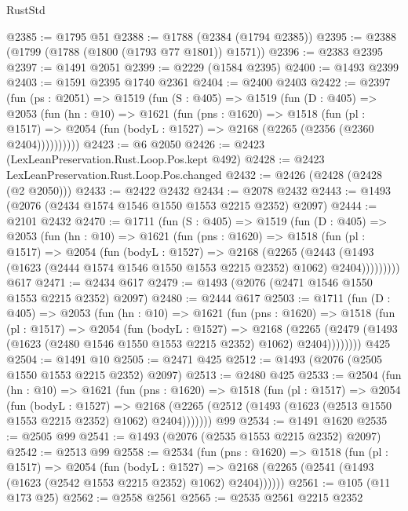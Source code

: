 \begin{lexlean}{RustStd}
\begin{coremodule}
@2385 := @1795 @51
@2388 := @1788 (@2384 (@1794 @2385))
@2395 := @2388 (@1799 (@1788 (@1800 (@1793 @77 @1801)) @1571))
@2396 := @2383 @2395
@2397 := @1491 @2051
@2399 := @2229 (@1584 @2395)
@2400 := @1493 @2399
@2403 := @1591 @2395 @1740 @2361
@2404 := @2400 @2403
@2422 := @2397
    (fun (ps : @2051) =>
    @1519
      (fun (S : @405) =>
      @1519
        (fun (D : @405) =>
        @2053
          (fun (hn : @10) =>
          @1621
            (fun (pns : @1620) =>
            @1518
              (fun (pl : @1517) =>
              @2054 (fun (bodyL : @1527) => @2168 (@2265 (@2356 (@2360 @2404))))))))))
@2423 := @6 @2050
@2426 := @2423 (LexLeanPreservation.Rust.Loop.Pos.kept @492)
@2428 := @2423 LexLeanPreservation.Rust.Loop.Pos.changed
@2432 := @2426 (@2428 (@2428 (@2 @2050)))
@2433 := @2422 @2432
@2434 := @2078 @2432
@2443 := @1493 (@2076 (@2434 @1574 @1546 @1550 @1553 @2215 @2352) @2097)
@2444 := @2101 @2432
@2470 := @1711
    (fun (S : @405) =>
    @1519
      (fun (D : @405) =>
      @2053
        (fun (hn : @10) =>
        @1621
          (fun (pns : @1620) =>
          @1518
            (fun (pl : @1517) =>
            @2054
              (fun (bodyL : @1527) =>
              @2168
                (@2265
                  (@2443
                    (@1493 (@1623 (@2444 @1574 @1546 @1550 @1553 @2215 @2352) @1062) @2404)))))))))
    @617
@2471 := @2434 @617
@2479 := @1493 (@2076 (@2471 @1546 @1550 @1553 @2215 @2352) @2097)
@2480 := @2444 @617
@2503 := @1711
    (fun (D : @405) =>
    @2053
      (fun (hn : @10) =>
      @1621
        (fun (pns : @1620) =>
        @1518
          (fun (pl : @1517) =>
          @2054
            (fun (bodyL : @1527) =>
            @2168
              (@2265 (@2479 (@1493 (@1623 (@2480 @1546 @1550 @1553 @2215 @2352) @1062) @2404))))))))
    @425
@2504 := @1491 @10
@2505 := @2471 @425
@2512 := @1493 (@2076 (@2505 @1550 @1553 @2215 @2352) @2097)
@2513 := @2480 @425
@2533 := @2504
    (fun (hn : @10) =>
    @1621
      (fun (pns : @1620) =>
      @1518
        (fun (pl : @1517) =>
        @2054
          (fun (bodyL : @1527) =>
          @2168 (@2265 (@2512 (@1493 (@1623 (@2513 @1550 @1553 @2215 @2352) @1062) @2404)))))))
    @99
@2534 := @1491 @1620
@2535 := @2505 @99
@2541 := @1493 (@2076 (@2535 @1553 @2215 @2352) @2097)
@2542 := @2513 @99
@2558 := @2534
    (fun (pns : @1620) =>
    @1518
      (fun (pl : @1517) =>
      @2054
        (fun (bodyL : @1527) =>
        @2168 (@2265 (@2541 (@1493 (@1623 (@2542 @1553 @2215 @2352) @1062) @2404))))))
@2561 := @105 (@11 @173 @25)
@2562 := @2558 @2561
@2565 := @2535 @2561 @2215 @2352

\end{coremodule}
\end{lexlean}
